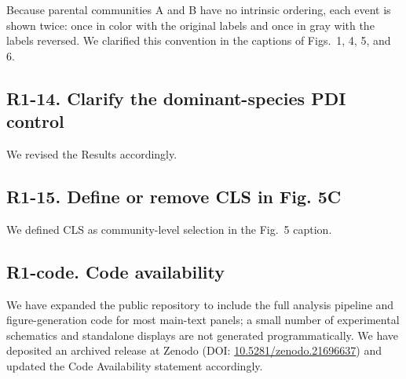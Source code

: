 Because parental communities A and B have no intrinsic ordering, each event is shown twice: once in color with the original labels and once in gray with the labels reversed. We clarified this convention in the captions of Figs.~1, 4, 5, and 6.

\subsection*{R1-14. Clarify the dominant-species PDI control}


We revised the Results accordingly.

\subsection*{R1-15. Define or remove CLS in Fig. 5C}


We defined CLS as community-level selection in the Fig.~5 caption.

\subsection*{R1-code. Code availability}


We have expanded the public repository to include the full analysis pipeline and
figure-generation code for most main-text panels; a small number of experimental
schematics and standalone displays are not generated programmatically. We have
deposited an archived release at Zenodo
(DOI: \href{https://doi.org/10.5281/zenodo.21696637}{10.5281/zenodo.21696637})
and updated the Code Availability statement accordingly.
